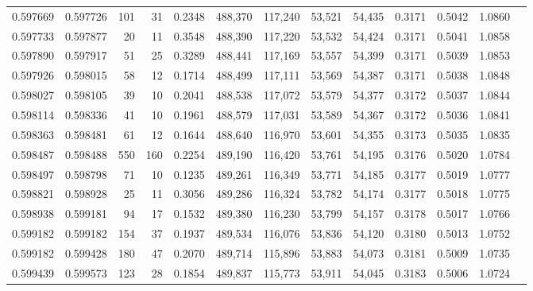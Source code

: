 \begin{tabular}{rrrrrrrrrrrrr}
0.597669 & 0.597726 &   101 &  31 &                                     0.2348 & 488,370 & 117,240 &  53,521 &  54,435 & 0.3171 & 0.5042 & 1.0860 \\
0.597733 & 0.597877 &    20 &  11 &                                     0.3548 & 488,390 & 117,220 &  53,532 &  54,424 & 0.3171 & 0.5041 & 1.0858 \\
0.597890 & 0.597917 &    51 &  25 &                                     0.3289 & 488,441 & 117,169 &  53,557 &  54,399 & 0.3171 & 0.5039 & 1.0853 \\
0.597926 & 0.598015 &    58 &  12 &                                     0.1714 & 488,499 & 117,111 &  53,569 &  54,387 & 0.3171 & 0.5038 & 1.0848 \\
0.598027 & 0.598105 &    39 &  10 &                                     0.2041 & 488,538 & 117,072 &  53,579 &  54,377 & 0.3172 & 0.5037 & 1.0844 \\
0.598114 & 0.598336 &    41 &  10 &                                     0.1961 & 488,579 & 117,031 &  53,589 &  54,367 & 0.3172 & 0.5036 & 1.0841 \\
0.598363 & 0.598481 &    61 &  12 &                                     0.1644 & 488,640 & 116,970 &  53,601 &  54,355 & 0.3173 & 0.5035 & 1.0835 \\
0.598487 & 0.598488 &   550 & 160 &                                     0.2254 & 489,190 & 116,420 &  53,761 &  54,195 & 0.3176 & 0.5020 & 1.0784 \\
0.598497 & 0.598798 &    71 &  10 &                                     0.1235 & 489,261 & 116,349 &  53,771 &  54,185 & 0.3177 & 0.5019 & 1.0777 \\
0.598821 & 0.598928 &    25 &  11 &                                     0.3056 & 489,286 & 116,324 &  53,782 &  54,174 & 0.3177 & 0.5018 & 1.0775 \\
0.598938 & 0.599181 &    94 &  17 &                                     0.1532 & 489,380 & 116,230 &  53,799 &  54,157 & 0.3178 & 0.5017 & 1.0766 \\
0.599182 & 0.599182 &   154 &  37 &                                     0.1937 & 489,534 & 116,076 &  53,836 &  54,120 & 0.3180 & 0.5013 & 1.0752 \\
0.599182 & 0.599428 &   180 &  47 &                                     0.2070 & 489,714 & 115,896 &  53,883 &  54,073 & 0.3181 & 0.5009 & 1.0735 \\
0.599439 & 0.599573 &   123 &  28 &                                     0.1854 & 489,837 & 115,773 &  53,911 &  54,045 & 0.3183 & 0.5006 & 1.0724 \\

\end{tabular}
